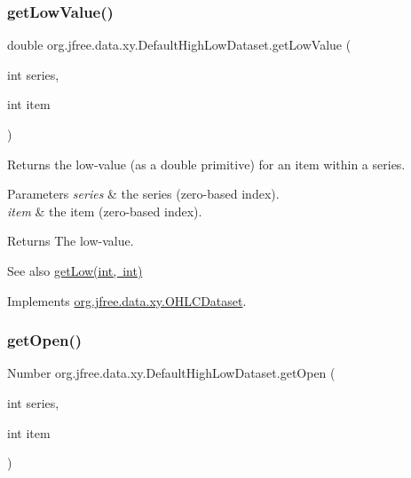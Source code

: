 \subsubsection{\texorpdfstring{get\+Low\+Value()}{getLowValue()}}
{\footnotesize\ttfamily double org.\+jfree.\+data.\+xy.\+Default\+High\+Low\+Dataset.\+get\+Low\+Value (\begin{DoxyParamCaption}\item[{int}]{series,  }\item[{int}]{item }\end{DoxyParamCaption})}

Returns the low-\/value (as a double primitive) for an item within a series.


\begin{DoxyParams}{Parameters}
{\em series} & the series (zero-\/based index). \\
\hline
{\em item} & the item (zero-\/based index).\\
\hline
\end{DoxyParams}
\begin{DoxyReturn}{Returns}
The low-\/value.
\end{DoxyReturn}
\begin{DoxySeeAlso}{See also}
\mbox{\hyperlink{classorg_1_1jfree_1_1data_1_1xy_1_1_default_high_low_dataset_a01dec545835846178a9731df03bbc435}{get\+Low(int, int)}} 
\end{DoxySeeAlso}


Implements \mbox{\hyperlink{interfaceorg_1_1jfree_1_1data_1_1xy_1_1_o_h_l_c_dataset_a19a2a153a113ed4f82eedd596e94d1ed}{org.\+jfree.\+data.\+xy.\+O\+H\+L\+C\+Dataset}}.

\mbox{\label{classorg_1_1jfree_1_1data_1_1xy_1_1_default_high_low_dataset_a8fd97df563c199b6ace3bb56ac18b0a1}} 
\subsubsection{\texorpdfstring{get\+Open()}{getOpen()}}
{\footnotesize\ttfamily Number org.\+jfree.\+data.\+xy.\+Default\+High\+Low\+Dataset.\+get\+Open (\begin{DoxyParamCaption}\item[{int}]{series,  }\item[{int}]{item }\end{DoxyParamCaption})}

